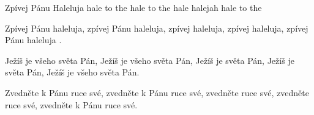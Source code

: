\begin{TEXT}{Zpívej Pánu Haleluja}
\SLOKA[angl:]	 hale to the  \NL
	 hale to the \NL
	 hale  halejah\NL
	 hale to the  

\SLOKA	Zpívej Pánu haleluja,\NL
	zpívej Pánu haleluja,\NL
	zpívej haleluja, zpívej haleluja,\NL
	zpívej Pánu haleluja .

\SLOKA	Ježíš je všeho světa Pán,\NL
	Ježíš je všeho světa Pán,\NL
	Ježíš je světa Pán, Ježíš je světa Pán,	\NL
	Ježíš je všeho světa Pán.

\SLOKA	Zvedněte k Pánu ruce své,\NL
	zvedněte k Pánu ruce své,\NL
	zvedněte ruce své, zvedněte ruce své,\NL
	zvedněte k Pánu ruce své.

\end{TEXT}
